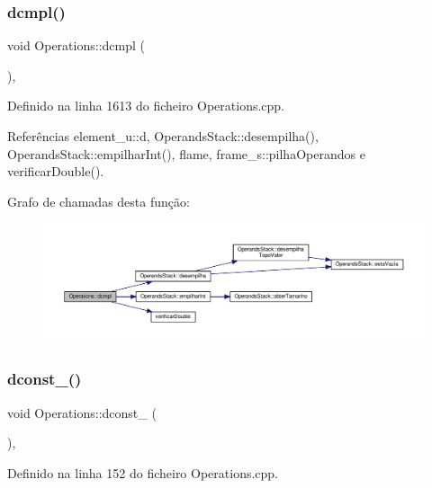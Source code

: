 \subsubsection{\texorpdfstring{dcmpl()}{dcmpl()}}
{\footnotesize\ttfamily void Operations\+::dcmpl (\begin{DoxyParamCaption}{ }\end{DoxyParamCaption})\hspace{0.3cm}{\ttfamily [static]}, {\ttfamily [private]}}



Definido na linha 1613 do ficheiro Operations.\+cpp.



Referências element\+\_\+u\+::d, Operands\+Stack\+::desempilha(), Operands\+Stack\+::empilhar\+Int(), flame, frame\+\_\+s\+::pilha\+Operandos e verificar\+Double().

Grafo de chamadas desta função\+:
\nopagebreak
\begin{figure}[H]
\begin{center}
\leavevmode
\includegraphics[width=350pt]{classOperations_a89e1792d8c650c2274352c534cfbd7c0_cgraph}
\end{center}
\end{figure}
\mbox{\label{classOperations_abd7f711342c43f7fa4e93b41931e6c86}} 
\subsubsection{\texorpdfstring{dconst\+\_()}{dconst\_0()}}
{\footnotesize\ttfamily void Operations\+::dconst\+\_ (\begin{DoxyParamCaption}{ }\end{DoxyParamCaption})\hspace{0.3cm}{\ttfamily [static]}, {\ttfamily [private]}}



Definido na linha 152 do ficheiro Operations.\+cpp.



